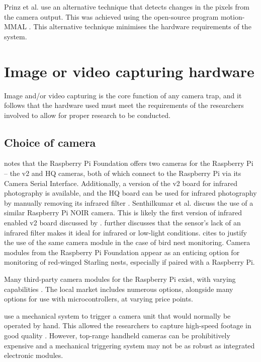 Prinz et al. \cite{prinz2016a} use an alternative technique that detects changes in the pixels from the camera output. This was achieved using the open-source program motion-MMAL \cite{prinz2016a}. This alternative technique minimises the hardware requirements of the system.


\section{Image or video capturing hardware}

Image and/or video capturing is the core function of any camera trap, and it follows that the hardware used must meet the requirements of the researchers involved to allow for proper research to be conducted.

\subsection{Choice of camera}

\cite{jolles2021broad-scale} notes that the Raspberry Pi Foundation offers two cameras for the Raspberry Pi -- the v2 and HQ cameras, both of which connect to the Raspberry Pi via its Camera Serial Interface. Additionally, a version of the v2 board for infrared photography is available, and the HQ board can be used for infrared photography by manually removing its infrared filter \cite{jolles2021broad-scale}. Senthilkumar et al. \cite{senthilkumar2014embedded} discuss the use of a similar Raspberry Pi NOIR camera. This is likely the first version of infrared enabled v2 board discussed by \cite{jolles2021broad-scale}. \cite{senthilkumar2014embedded} further discusses that the sensor's lack of an infrared filter makes it ideal for infrared or low-light conditions. \cite{prinz2016a} cites \cite{senthilkumar2014embedded} to justify the use of the same camera module in the case of bird nest monitoring. Camera modules from the Raspberry Pi Foundation appear as an enticing option for monitoring of red-winged Starling nests, especially if paired with a Raspberry Pi.

Many third-party camera modules for the Raspberry Pi exist, with varying capabilities \cite{jolles2021broad-scale}. The local market includes numerous options, alongside many options for use with microcontrollers, at varying price points.

\cite{rico-guevara2017bring} use a mechanical system to trigger a camera unit that would normally be operated by hand. This allowed the researchers to capture high-speed footage in good quality \cite{rico-guevara2017bring}. However, top-range handheld cameras can be prohibitively expensive and a mechanical triggering system may not be as robust as integrated electronic modules.

